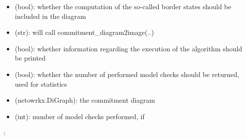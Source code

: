 \documentclass[letterpaper,10pt,english]{sphinxmanual}
\begin{document}
\begin{fulllineitems}
\begin{description}
\begin{itemize}
\item {} 
 (bool): whether the computation of the so-called border states should be included in the diagram

\item {} 
 (str): will call commitment\_diagram2image(..)

\item {} 
 (bool): whether information regarding the execution of the algorithm should be printed

\item {} 
 (bool): whether the number of performed model checks should be returned, used for statistics

\end{itemize}

\item[{\sphinxstylestrong{returns}::}] \leavevmode\begin{itemize}
\item {} 
 (netowrkx.DiGraph): the commitment diagram

\item {} 
 (int): number of model checks performed, if 

\end{itemize}

\end{description}

:

\begin{sphinxVerbatim}[commandchars=\\\{\}]
  
   
\PYG{p}{[}\PYG{p}{]}\PYG{p}{[}\PYG{p}{]}
\PYG{p}{[}\PYG{p}{]}\PYG{p}{[}\PYG{p}{]}
\end{sphinxVerbatim}

\end{fulllineitems}
\end{document}
